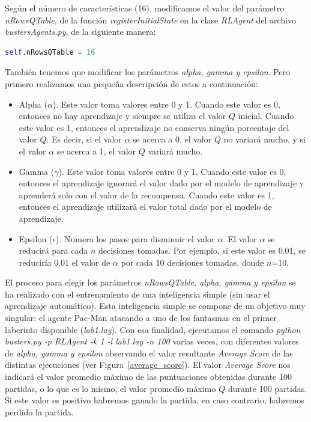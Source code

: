 \documentclass[11pt]{exam}
\begin{document}
Según el número de características (16), modificamos el valor del parámetro \textit{nRowsQTable}, de la función \textit{registerInitialState} en la clase \textit{RLAgent} del archivo \textit{bustersAgents.py}, de la siguiente manera:

\begin{lstlisting}[language=python, basicstyle=\footnotesize]
self.nRowsQTable = 16
\end{lstlisting}

También tenemos que modificar los parámetros \textit{alpha, gamma y epsilon}. Pero primero realizamos una pequeña descripción de estos a continuación:

\begin{itemize}
	\item Alpha ($\alpha$). Este valor toma valores entre 0 y 1. Cuando este valor es 0, entonces no hay aprendizaje y siempre se utiliza el valor $Q$ inicial. Cuando este valor es 1, entonces el aprendizaje no conserva ningún porcentaje del valor $Q$. Es decir, si el valor $\alpha$ se acerca a 0, el valor $Q$ no variará mucho, y si el valor $\alpha$ se acerca a 1, el valor $Q$ variará mucho.
	
	\item Gamma ($\gamma$). Este valor toma valores entre 0 y 1. Cuando este valor es 0, entonces el aprendizaje ignorará el valor dado por el modelo de aprendizaje y aprenderá solo con el valor de la recompensa. Cuando este valor es 1, entonces el aprendizaje utilizará el valor total dado por el modelo de aprendizaje.
	
	\item Epsilon ($\epsilon$). Numera los pasos para disminuir el valor $\alpha$. El valor $\alpha$ se reducirá para cada $n$ decisiones tomadas. Por ejemplo, si este valor es 0.01, se reduciría 0.01 el valor de $\alpha$ por cada 10 decisiones tomadas, donde $n$=10.
\end{itemize}

El proceso para elegir los parámetros \textit{nRowsQTable, alpha, gamma y epsilon} se ha realizado con el entrenamiento de una inteligencia simple (sin usar el aprendizaje automático). Esta inteligencia simple se compone de un objetivo muy singular: el agente Pac-Man atacando a uno de los fantasmas en el primer laberinto disponible (\textit{lab1.lay}). Con esa finalidad, ejecutamos el comando \textit{python busters.py -p RLAgent -k 1 -l lab1.lay -n 100} varias veces, con diferentes valores de \textit{alpha, gamma y epsilon} observando el valor resultante \textit{Average Score} de las distintas ejecuciones (ver Figura~\ref{average_score}). El valor \textit{Average Score} nos indicará el valor promedio máximo de las puntuaciones obtenidas durante 100 partidas, o lo que es lo mismo, el valor promedio máximo $Q$ durante 100 partidas. Si este valor es positivo habremos ganado la partida, en caso contrario, habremos perdido la partida.
\end{document}
